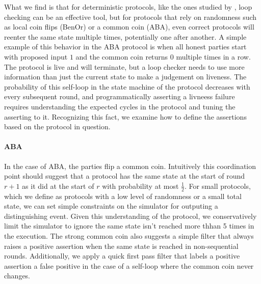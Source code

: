 What we find is that for deterministic protocols, like the ones studied by \cite{formalbyzantine}, loop checking can be an effective tool, but for protocols that rely on randomness such as local coin flips (BenOr) or a common coin (ABA), even correct protocols will reenter the same state multiple times, potentially one after another.
A simple example of this behavior in the ABA protocol is when all honest parties start with proposed input $1$ and the common coin returns $0$ multiple times in a row.
The protocol is live and will terminate, but a loop checker needs to use more information than just the current state to make a judgement on liveness.
The probability of this self-loop in the state machine of the protocol decreases with every subsequent round, and programmatically asserting a livneess failure requires understanding the expected cycles in the protocol and tuning the asserting to it.
Recognizing this fact, we examine how to define the assertions based on the protocol in question.

\paragraph{ABA}
In the case of ABA, the parties flip a common coin. 
Intuitively this coordination point should suggest that a protocol has the same state at the start of round $r+1$ as it did at the start of $r$ with probability at most $\frac{1}{2}$. 
For small protocols, which we define as protocols with a low level of randomness or a small total state, we can set simple constraints on the simulator for outputing a distinguishing event.
Given this understanding of the protocol, we conservatively limit the simulator to ignore the same state isn't reached more thhan 5 times in the execution. 
The strong common coin also suggests a simple filter that always raises a positive assertion when the same state is reached in non-sequential rounds. 
Additionally, we apply a quick first pass filter that labels a positive assertion a false positive in the case of a self-loop where the common coin never changes.

